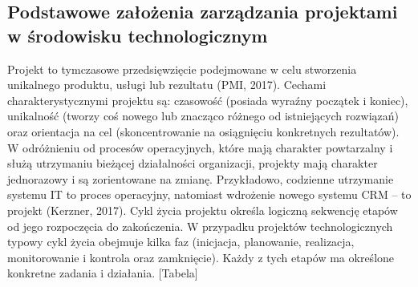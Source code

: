 \subsection{Podstawowe założenia zarządzania projektami w środowisku technologicznym}
\label{subsec:podrozdzial-2-rzedu}
Projekt to tymczasowe przedsięwzięcie podejmowane w celu stworzenia unikalnego
produktu, usługi lub rezultatu (PMI, 2017). Cechami charakterystycznymi projektu są:
czasowość (posiada wyraźny początek i koniec), unikalność (tworzy coś nowego lub
znacząco różnego od istniejących rozwiązań) oraz orientacja na cel (skoncentrowanie na
osiągnięciu konkretnych rezultatów). W odróżnieniu od procesów operacyjnych, które mają
charakter powtarzalny i służą utrzymaniu bieżącej działalności organizacji, projekty mają
charakter jednorazowy i są zorientowane na zmianę. Przykładowo, codzienne utrzymanie
systemu IT to proces operacyjny, natomiast wdrożenie nowego systemu CRM – to projekt
(Kerzner, 2017).
Cykl życia projektu określa logiczną sekwencję etapów od jego rozpoczęcia do zakończenia.
W przypadku projektów technologicznych typowy cykl życia obejmuje kilka faz (inicjacja,
planowanie, realizacja, monitorowanie i kontrola oraz zamknięcie). Każdy z tych etapów ma
określone konkretne zadania i działania. [Tabela]
